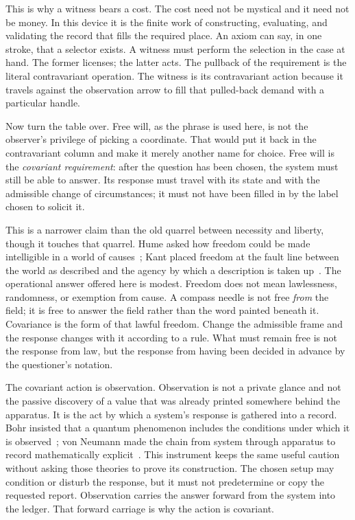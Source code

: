 \documentclass[12pt,oneside]{book}
\begin{document}
This is why a witness bears a cost. The cost need not be mystical and it need not be money. In this device it is the
finite work of constructing, evaluating, and validating the record that fills the required place. An axiom can say, in one
stroke, that a selector exists. A witness must perform the selection in the case at hand. The former licenses; the
latter acts. The pullback of the requirement is the literal contravariant operation. The witness is its contravariant
action because it travels against the observation arrow to fill that pulled-back demand with a particular handle.

Now turn the table over. Free will, as the phrase is used here, is not the observer's privilege of picking a coordinate.
That would put it back in the contravariant column and make it merely another name for choice. Free will is the
\emph{covariant requirement}: after the question has been chosen, the system must still be able to answer. Its response
must travel with its state and with the admissible change of circumstances; it must not have been filled in by the
label chosen to solicit it.

This is a narrower claim than the old quarrel between necessity and liberty, though it touches that quarrel. Hume asked
how freedom could be made intelligible in a world of causes~\cite{hume1748}; Kant placed freedom at the fault line
between the world as described and the agency by which a description is taken up~\cite{kant1781}. The operational
answer offered here is modest. Freedom does not mean lawlessness, randomness, or exemption from cause. A compass needle
is not free \emph{from} the field; it is free to answer the field rather than the word painted beneath it. Covariance is
the form of that lawful freedom. Change the admissible frame and the response changes with it according to a rule. What
must remain free is not the response from law, but the response from having been decided in advance by the questioner's
notation.

The covariant action is observation. Observation is not a private glance and not the passive discovery of a value that
was already printed somewhere behind the apparatus. It is the act by which a system's response is gathered into a
record. Bohr insisted that a quantum phenomenon includes the conditions under which it is observed~\cite{bohr1928}; von
Neumann made the chain from system through apparatus to record mathematically explicit~\cite{vonneumann1932}. This
instrument keeps the same useful caution without asking those theories to prove its construction. The chosen setup may
condition or disturb the response, but it must not predetermine or copy the requested report. Observation carries the
answer forward from the system into the ledger. That forward carriage is why the action is covariant.
\end{document}
